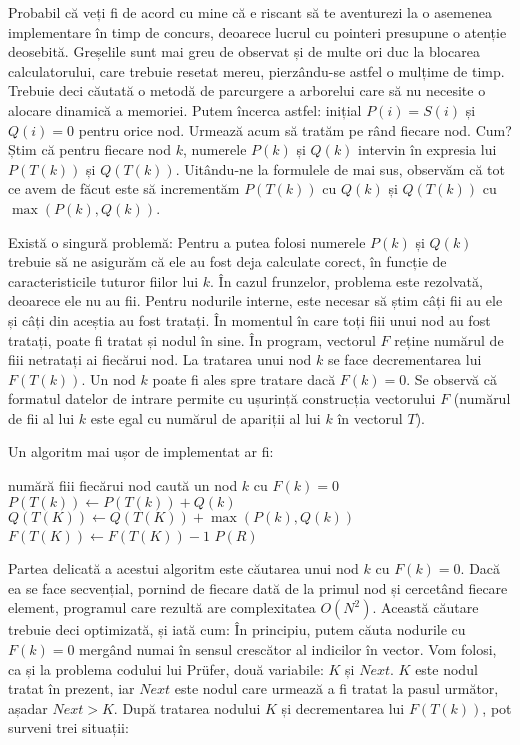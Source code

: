 Probabil că veți fi de acord cu mine că e riscant să te aventurezi la o
asemenea implementare în timp de concurs, deoarece lucrul cu pointeri
presupune o atenție deosebită. Greșelile sunt mai greu de observat și de multe
ori duc la blocarea calculatorului, care trebuie resetat mereu, pierzându-se
astfel o mulțime de timp. Trebuie deci căutată o metodă de parcurgere a
arborelui care să nu necesite o alocare dinamică a memoriei. Putem încerca
astfel: inițial $P(i)=S(i)$ și $Q(i)=0$ pentru orice nod. Urmează acum să
tratăm pe rând fiecare nod. Cum? Știm că pentru fiecare nod $k$, numerele
$P(k)$ și $Q(k)$ intervin în expresia lui $P(T(k))$ și $Q(T(k))$. Uitându-ne
la formulele de mai sus, observăm că tot ce avem de făcut este să incrementăm
$P(T(k))$ cu $Q(k)$ și $Q(T(k))$ cu $\max(P(k), Q(k))$.

Există o singură problemă: Pentru a putea folosi numerele $P(k)$ și $Q(k)$
trebuie să ne asigurăm că ele au fost deja calculate corect, în funcție de
caracteristicile tuturor fiilor lui $k$. În cazul frunzelor, problema este
rezolvată, deoarece ele nu au fii. Pentru nodurile interne, este necesar să
știm câți fii au ele și câți din aceștia au fost tratați. În momentul în care
toți fiii unui nod au fost tratați, poate fi tratat și nodul în sine. În
program, vectorul $F$ reține numărul de fiii netratați ai fiecărui nod. La
tratarea unui nod $k$ se face decrementarea lui $F(T(k))$. Un nod $k$ poate fi
ales spre tratare dacă $F(k)=0$. Se observă că formatul datelor de intrare
permite cu ușurință construcția vectorului $F$ (numărul de fii al lui $k$ este
egal cu numărul de apariții al lui $k$ în vectorul $T$).

Un algoritm mai ușor de implementat ar fi:

\vspace{\algskip}
\begin{algorithmic}[1]
  \STATE numără fiii fiecărui nod
  \STATE caută un nod $k$ cu $F(k)=0$
  \STATE $P(T(k)) \leftarrow P(T(k))+Q(k)$
  \STATE $Q(T(K)) \leftarrow Q(T(K))+\max(P(k),Q(k))$
  \STATE $F(T(K)) \leftarrow F(T(K))-1$
  \ENDFOR
  \PRINT $P(R)$
\end{algorithmic}

Partea delicată a acestui algoritm este căutarea unui nod $k$ cu
$F(k)=0$. Dacă ea se face secvențial, pornind de fiecare dată de la primul nod
și cercetând fiecare element, programul care rezultă are complexitatea
$O(N^2)$. Această căutare trebuie deci optimizată, și iată cum: În principiu,
putem căuta nodurile cu $F(k)=0$ mergând numai în sensul crescător al
indicilor în vector. Vom folosi, ca și la problema codului lui Prüfer, două
variabile: $K$ și $Next$. $K$ este nodul tratat în prezent, iar $Next$ este
nodul care urmează a fi tratat la pasul următor, așadar $Next > K$. După
tratarea nodului $K$ și decrementarea lui $F(T(k))$, pot surveni trei
situații:

